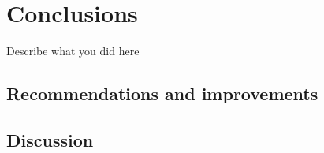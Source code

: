 \chapter{Conclusions}
\label{cha:conclusion}

Describe what you did here

\section{Recommendations and improvements}

\section{Discussion}